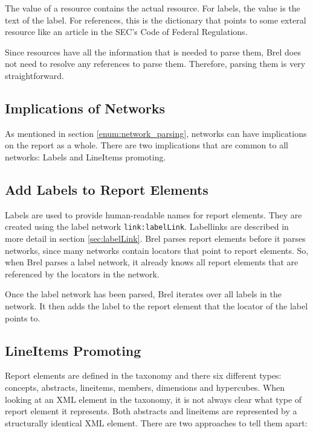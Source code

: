 The value of a resource contains the actual resource.
For labels, the value is the text of the label.
For references, this is the dictionary that points to some exteral resource like an article in the SEC's Code of Federal Regulations.

Since resources have all the information that is needed to parse them, Brel does not need to resolve any references to parse them.
Therefore, parsing them is very straightforward.

\subsection{Implications of Networks}

As mentioned in section \ref{enum:network_parsing}, networks can have implications on the report as a whole.
There are two implications that are common to all networks: Labels and LineItems promoting.

\subsection{Add Labels to Report Elements}

Labels are used to provide human-readable names for report elements.
They are created using the label network \texttt{link:labelLink}.
Labellinks are described in more detail in section \ref{sec:labelLink}.
Brel parses report elements before it parses networks, since many networks contain locators that point to report elements.
So, when Brel parses a label network, it already knows all report elements that are referenced by the locators in the network.

Once the label network has been parsed, Brel iterates over all labels in the network.
It then adds the label to the report element that the locator of the label points to.

\subsection{LineItems Promoting}

Report elements are defined in the taxonomy and there six different types: concepts, abstracts, lineitems, members, dimensions and hypercubes.
When looking at an XML element in the taxonomy, it is not always clear what type of report element it represents.
Both abstracts and lineitems are represented by a structurally identical XML element.
There are two approaches to tell them apart: 

